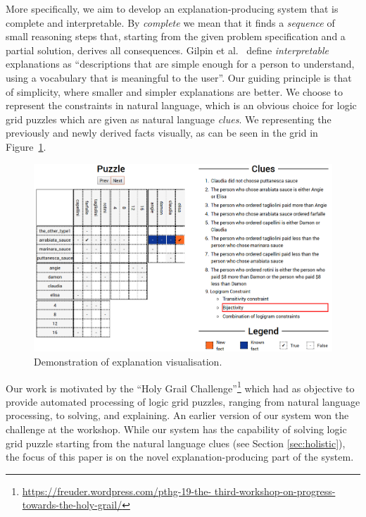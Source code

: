More specifically, we aim to develop an explanation-producing system that is complete and interpretable. 
By \textit{complete} we mean that it finds a \textit{sequence} of small reasoning steps that, starting from the given problem specification and a partial solution, derives all consequences. 
Gilpin et al.~\cite{DBLP:conf/dsaa/GilpinBYBSK18} define \textit{interpretable} explanations as ``descriptions that are simple enough for a person to understand, using a vocabulary that is meaningful to the user''. 
Our guiding principle is that of simplicity, where smaller and simpler explanations are better.
We choose to represent the constraints in natural language, which is an obvious choice for logic grid puzzles which are given as natural language \textit{clues}. 
We representing the previously and newly derived facts visually, as can be seen in the grid in Figure~\ref{fig:zebrascreen}.

\begin{figure}[ht]
\centering
\includegraphics[width=\linewidth]{zebra_screen}
\caption{Demonstration of explanation visualisation.}
\label{fig:zebrascreen}
\end{figure}

Our work is motivated by the ``Holy Grail Challenge''\footnote{\tiny \url{https://freuder.wordpress.com/pthg-19-the- third-workshop-on-progress-towards-the-holy-grail/}} which had as objective to provide automated processing of logic grid puzzles, ranging from natural language processing, to solving, and explaining. 
An earlier version of our system won the challenge at the workshop. 
While our system has the capability of solving logic grid puzzle starting from the natural language clues (see Section \ref{sec:holistic}), the focus of this paper is on the novel explanation-producing part of the system.

